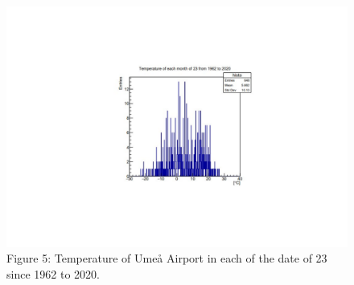 \documentclass[a4, 12pt]{article}
\begin{document}
\begin{figure}[H]
\centering
\includegraphics[scale=0.7]{chrisFig3.pdf}
\caption*{Figure 5: Temperature of Umeå Airport in each of the date of 23 since 1962 to 2020.}
\end{figure}







\end{document}
